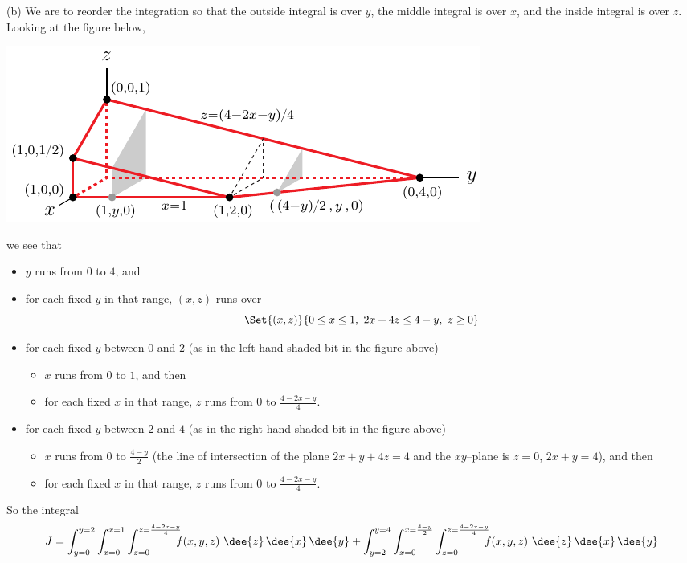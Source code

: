 \begin{solution}
(b)
We are to reorder the integration so that the outside integral
is over $y$, the middle integral is over $x$, and the inside integral 
is over $z$. Looking at the figure below, 
\begin{center}
     \includegraphics{fig/OE06D_6a4.pdf}
\end{center}
we see that
\begin{itemize}
\item
$y$ runs from $0$ to $4$, and
\item
for each fixed $y$ in that range, $(x,z)$ runs over
\begin{equation*}
\Set{(x,z)}{0\le x\le 1,\ 2x+4z\le 4-y,\ z\ge 0}
\end{equation*}
\item
for each fixed $y$ between $0$ and $2$ (as in the left hand shaded bit in
the figure above)
\begin{itemize}
\item 
$x$ runs from $0$ to $1$, and then
\item
for each fixed $x$ in that range, $z$ runs from $0$ to $\frac{4-2x-y}{4}$. 
\end{itemize}

\item
for each fixed $y$ between $2$ and $4$ (as in the right hand shaded bit in
the figure above)
\begin{itemize}
\item 
$x$ runs from $0$ to $\frac{4-y}{2}$ (the line of intersection of the
plane $2x+y+4z=4$ and the $xy$--plane is $z=0$, $2x+y=4$), and then
\item
for each fixed $x$ in that range, $z$ runs from $0$ to $\frac{4-2x-y}{4}$. 
\end{itemize}
\end{itemize}
So the integral 
\begin{align*}
J = \int_{y=0}^{y=2} \int_{x=0}^{x=1} \int_{z=0}^{z=\frac{4-2x-y}{4}}
        \!\!\!\! f(x,y,z)  \ \dee{z}\,\dee{x}\,\dee{y}
+\int_{y=2}^{y=4} \int_{x=0}^{x=\frac{4-y}{2}} \int_{z=0}^{z=\frac{4-2x-y}{4}} 
        \!\!\!\!  f(x,y,z)\ \dee{z}\,\dee{x}\,\dee{y}
\end{align*}
\end{solution}


